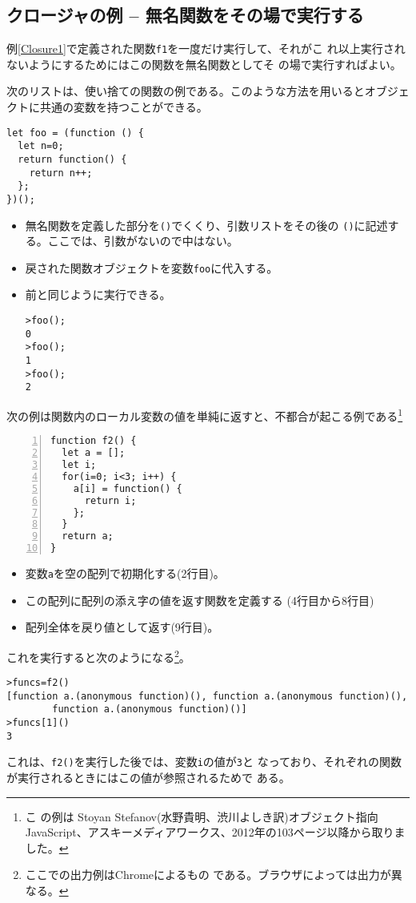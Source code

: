 \iffalse
次の章
では関数を用いてオブジェクトを作成することができることを紹介する。このと
き、同じ関数から作成されるオブジェクトに共通の変数を使うことはこの方法で
はできない。
\fi
  \subsection{クロージャの例 -- 無名関数をその場で実行する}
 例\ref{Closure1}で定義された関数\texttt{f1}を一度だけ実行して、それがこ
				れ以上実行されないようにするためにはこの関数を無名関数としてそ
				の場で実行すればよい。
\begin{Exec}\upshape
  次のリストは、使い捨ての関数の例である。このような方法を用いるとオブジェ
    クトに共通の変数を持つことができる。
\begin{Verbatim}
let foo = (function () {
  let n=0;
  return function() {
    return n++;
  };
})();
\end{Verbatim}
\begin{itemize}
 \item 無名関数を定義した部分を\texttt{()}でくくり、引数リストをその後の
			 \texttt{()}に記述する。ここでは、引数がないので中はない。
 	\item 戻された関数オブジェクトを変数\texttt{foo}に代入する。
	\item 前と同じように実行できる。
\begin{Verbatim}
>foo();
0
>foo();
1
>foo();
2
\end{Verbatim}
\end{itemize}
\end{Exec}
\begin{Exec}\upshape\label{functionsReturnLocalValue}
次の例は関数内のローカル変数の値を単純に返すと、不都合が起こる例である\footnote{こ
				の例は Stoyan Stefanov(水野貴明、渋川よしき訳)オブジェクト指向
				JavaScript、アスキーメディアワークス、2012年の103ページ以降から取りました。}
\begin{Verbatim}[numbers=left]
function f2() {
  let a = [];
  let i;
  for(i=0; i<3; i++) {
    a[i] = function() {
      return i;
    };
  }
  return a;
}
\end{Verbatim}
 \begin{itemize}\upshape
	\item 変数\texttt{a}を空の配列で初期化する(2行目)。
	\item この配列に配列の添え字の値を返す関数を定義する
				(4行目から8行目)
	\item 配列全体を戻り値として返す(9行目)。
 \end{itemize}
 これを実行すると次のようになる\footnote{ここでの出力例はChromeによるもの
 である。ブラウザによっては出力が異なる。}。
\begin{Verbatim}
>funcs=f2()
[function a.(anonymous function)(), function a.(anonymous function)(),
		function a.(anonymous function)()]
>funcs[1]()
3
\end{Verbatim}
 これは、\texttt{f2()}を実行した後では、変数\texttt{i}の値が\texttt{3}と
 なっており、それぞれの関数が実行されるときにはこの値が参照されるためで
 ある。
\end{Exec}
